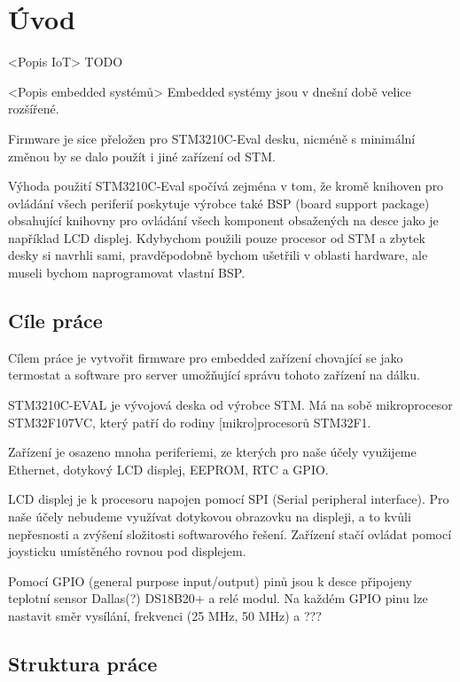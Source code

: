 \chapter*{Úvod}

<Popis IoT>
TODO

<Popis embedded systémů>
Embedded systémy jsou v dnešní době velice rozšířené.

Firmware je sice přeložen pro STM3210C-Eval desku, nicméně s minimální změnou by
se dalo použít i jiné zařízení od STM.

Výhoda použití STM3210C-Eval spočívá zejména v tom, že kromě knihoven pro ovládání
všech periferií poskytuje výrobce také BSP (board support package) obsahující
knihovny pro ovládání všech komponent obsažených na desce jako je například LCD
displej.
Kdybychom použili pouze procesor od STM a zbytek desky si navrhli sami, pravděpodobně
bychom ušetřili v oblasti hardware, ale museli bychom naprogramovat vlastní BSP.

\section{Cíle práce}
Cílem práce je vytvořit firmware pro embedded zařízení chovající se jako termostat
a software pro server umožňující správu tohoto zařízení na dálku.

STM3210C-EVAL je vývojová deska od výrobce STM. Má na sobě mikroprocesor STM32F107VC,
který patří do rodiny [mikro]procesorů STM32F1.

Zařízení je osazeno mnoha periferiemi, ze kterých pro naše účely využijeme Ethernet,
dotykový LCD displej, EEPROM, RTC a GPIO.

LCD displej je k procesoru napojen pomocí SPI (Serial peripheral interface).
Pro naše účely nebudeme využívat dotykovou obrazovku na displeji, a to kvůli nepřesnosti a
zvýšení složitosti softwarového řešení.
Zařízení stačí ovládat pomocí joysticku umístěného rovnou pod displejem.

Pomocí GPIO (general purpose input/output) pinů jsou k desce připojeny teplotní sensor
Dallas(?) DS18B20+ a relé modul.
Na každém GPIO pinu lze nastavit směr vysílání, frekvenci (25 MHz, 50 MHz) a ???

\section{Struktura práce}
